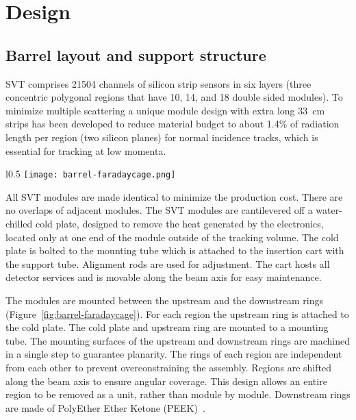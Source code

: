 \section{Design}

\subsection{Barrel layout and support structure}

SVT comprises 21504 channels of silicon strip sensors in six layers (three concentric polygonal regions that have 10, 14, and 18 double sided modules). 
To minimize multiple scattering a unique module design with extra long 33~cm strips has been developed to reduce material budget to about 1.4$\%$ of radiation length per region (two silicon planes) for normal incidence tracks, which is essential for tracking at low momenta. 

\begin{wrapfigure}{l}{0.5\columnwidth}
\centering 
\texttt{[image: barrel-faradaycage.png]}
\caption{Layout of the barrel and the Faraday Cage. Copper supports shown in yellow.  Supports are bolted directly to cold plate. Silicon sensors are shown in green.}
\label{fig:barrel-faradaycage}
\end{wrapfigure}

All SVT modules are made identical to minimize the production cost. There are no overlaps of adjacent modules. The SVT modules are cantilevered off a water-chilled cold plate, designed to remove the heat generated by the electronics, located only at one end of the module outside of the tracking volume. The cold plate is bolted to the mounting tube which is attached to the insertion cart with the support tube. Alignment rods are used for adjustment. The cart hosts all detector services and is movable along the beam axis for easy maintenance.



The modules  are mounted between the upstream and the downstream rings (Figure~\ref{fig:barrel-faradaycage}). For each region the upstream ring is attached to the cold plate. The cold plate and upstream ring are mounted to a mounting tube. The mounting surfaces of the upstream and downstream rings are machined in a single step to guarantee planarity. The rings of each region are independent from each other to prevent overconstraining the assembly.  Regions are shifted along the beam axis to ensure angular coverage. This design allows an entire region to be removed as a unit, rather than module by module. Downstream rings are made of PolyEther Ether Ketone (PEEK)~\cite{NIMVCC}. 

